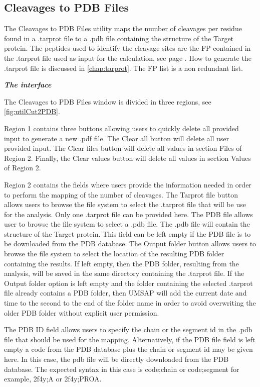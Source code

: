 \subsection{Cleavages to PDB Files}
\label{subsec:utilCut2Pdb}

The Cleavages to PDB Files utility maps the number of cleavages per residue found in a .tarprot file to a .pdb file containing the structure of the Target protein. The peptides used to identify the cleavage sites are the FP contained in the .tarprot file used as input for the calculation, see page \pageref{par:tarprotPIP}. How to generate the .tarprot file is discussed in \autoref{chap:tarprot}. The FP list is a non redundant list.

\textit{\textbf{The interface}}

The Cleavages to PDB Files window is divided in three regions, see \autoref{fig:utilCut2PDB}.

Region \num{1} contains three buttons allowing users to quickly delete all provided input to generate a new .pdf file. The Clear all button will delete all user provided input. The Clear files button will delete all values in section Files of Region \num{2}. Finally, the Clear values button will delete all values in section Values of Region \num{2}.

Region \num{2} contains the fields where users provide the information needed in order to perform the mapping of the number of cleavages. The Tarprot file button allows users to browse the file system to select the .tarprot file that will be use for the analysis. Only one .tarprot file can be provided here. The PDB file allows user to browse the file system to select a .pdb file. The .pdb file will contain the structure of the Target protein. This field can be left empty if the PDB file is to be downloaded from the PDB database. The Output folder button allows users to browse the file system to select the location of the resulting PDB folder containing the results. If left empty, then the PDB folder, resulting from the analysis, will be saved in the same directory containing the .tarprot file. If the Output folder option is left empty and the folder containing the selected .tarprot file already contains a PDB folder, then UMSAP will add the current date and time to the second to the end of the folder name in order to avoid overwriting the older PDB folder without explicit user permission.

The PDB ID field allows users to specify the chain or the segment id in the .pdb file that should be used for the mapping. Alternatively, if the PDB file field is left empty a code from the PDB database plus the chain or segment id may be given here. In this case, the pdb file will be directly downloaded from the PDB database. The expected syntax in this case is code;chain or code;segment for example, 2f4y;A or 2f4y;PROA.  


